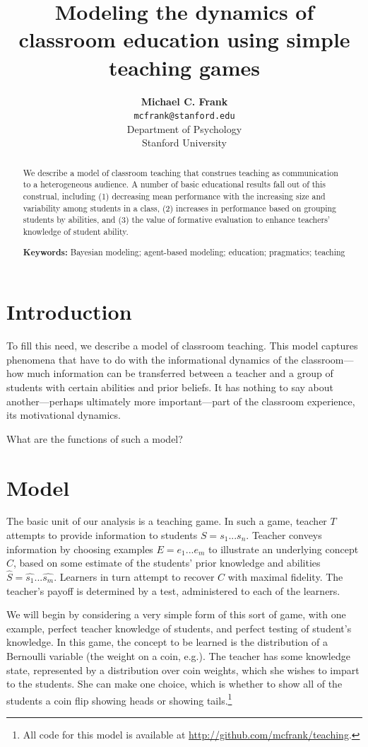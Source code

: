 \documentclass[10pt,letterpaper]{article}
\title{Modeling the dynamics of classroom education using simple teaching games}
\author{{\large \bf Michael C. Frank} \\
  \texttt{mcfrank@stanford.edu} \\
  Department of Psychology\\
  Stanford University}
\begin{document}
\maketitle

\begin{abstract}
We describe a model of classroom teaching that construes teaching as communication to a heterogeneous audience. A number of basic educational results fall out of this construal, including (1) decreasing mean performance with the increasing size and variability among students in a class, (2) increases in performance based on grouping students by abilities, and (3) the value of formative evaluation to enhance teachers' knowledge of student ability.

\textbf{Keywords:} 
Bayesian modeling; agent-based modeling; education; pragmatics; teaching
\end{abstract}

\section{Introduction}

To fill this need, we describe a model of classroom teaching. This model captures phenomena that have to do with the informational dynamics of the classroom---how much information can be transferred between a teacher and a group of students with certain abilities and prior beliefs. It has nothing to say about another---perhaps ultimately more important---part of the classroom experience, its motivational dynamics.  

What are the functions of such a model? 

\section{Model}

The basic unit of our analysis is a teaching game. In such a game, teacher $T$ attempts to provide information to students $S = {s_1 ... s_n}$. Teacher conveys information by choosing examples $E = {e_1 ... e_m}$ to illustrate an underlying concept $C$, based on some estimate of the students' prior knowledge and abilities $\hat{S} = {\hat{s_1} ... \hat{s_m}}$. Learners in turn attempt to recover $C$ with maximal fidelity. The teacher's payoff is determined by a test, administered to each of the learners. 

We will begin by considering a very simple form of this sort of game, with one example, perfect teacher knowledge of students, and perfect testing of student's knowledge. In this game, the concept to be learned is the distribution of a Bernoulli variable (the weight on a coin, e.g.). The teacher has some knowledge state, represented by a distribution over coin weights, which she wishes to impart to the students. She can make one choice, which is whether to show all of the students a coin flip showing heads or showing tails.\footnote{All code for this model is available at \url{http://github.com/mcfrank/teaching}.}
\end{document}
